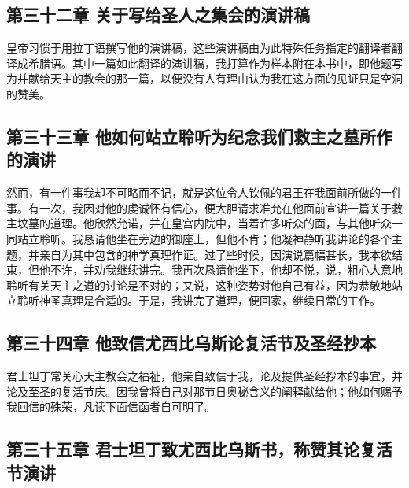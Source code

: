 
\subsection{第三十二章 关于写给圣人之集会的演讲稿}

皇帝习惯于用拉丁语撰写他的演讲稿，这些演讲稿由为此特殊任务指定的翻译者翻译成希腊语。其中一篇如此翻译的演讲稿，我打算作为样本附在本书中，即他题写为并献给天主的教会的那一篇，以便没有人有理由认为我在这方面的见证只是空洞的赞美。\par


\subsection{第三十三章 他如何站立聆听为纪念我们救主之墓所作的演讲}

然而，有一件事我却不可略而不记，就是这位令人钦佩的君王在我面前所做的一件事。有一次，我因对他的虔诚怀有信心，便大胆请求准允在他面前宣讲一篇关于救主坟墓的道理。他欣然允诺，并在皇宫内院中，当着许多听众的面，与其他听众一同站立聆听。我恳请他坐在旁边的御座上，但他不肯；他凝神静听我讲论的各个主题，并亲自为其中包含的神学真理作证。过了些时候，因演说篇幅甚长，我本欲结束，但他不许，并劝我继续讲完。我再次恳请他坐下，他却不悦，说，粗心大意地聆听有关天主之道的讨论是不对的；又说，这种姿势对他自己有益，因为恭敬地站立聆听神圣真理是合适的。于是，我讲完了道理，便回家，继续日常的工作。\par


\subsection{第三十四章 他致信尤西比乌斯论复活节及圣经抄本}

君士坦丁常关心天主教会之福祉，他亲自致信于我，论及提供圣经抄本的事宜，并论及至圣的复活节庆。因我曾将自己对那节日奥秘含义的阐释献给他；他如何赐予我回信的殊荣，凡读下面信函者自可明了。\par


\subsection{第三十五章 君士坦丁致尤西比乌斯书，称赞其论复活节演讲}

